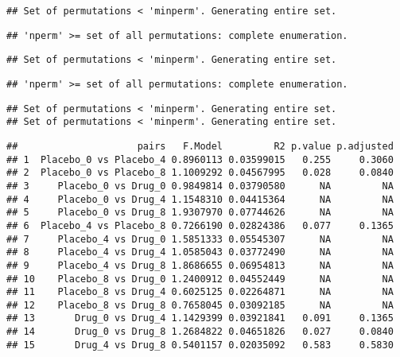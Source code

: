\documentclass[]{article}
\newenvironment{Shaded}{\begin{snugshade}}{\end{snugshade}}
\newcommand{\KeywordTok}[1]{\textcolor[rgb]{0.13,0.29,0.53}{\textbf{#1}}}
\newcommand{\DataTypeTok}[1]{\textcolor[rgb]{0.13,0.29,0.53}{#1}}
\newcommand{\StringTok}[1]{\textcolor[rgb]{0.31,0.60,0.02}{#1}}
\newcommand{\OtherTok}[1]{\textcolor[rgb]{0.56,0.35,0.01}{#1}}
\newcommand{\OperatorTok}[1]{\textcolor[rgb]{0.81,0.36,0.00}{\textbf{#1}}}
\newcommand{\NormalTok}[1]{#1}
\begin{document}
\begin{verbatim}
## Set of permutations < 'minperm'. Generating entire set.
\end{verbatim}

\begin{verbatim}
## 'nperm' >= set of all permutations: complete enumeration.
\end{verbatim}

\begin{verbatim}
## Set of permutations < 'minperm'. Generating entire set.
\end{verbatim}

\begin{verbatim}
## 'nperm' >= set of all permutations: complete enumeration.
\end{verbatim}

\begin{verbatim}
## Set of permutations < 'minperm'. Generating entire set.
## Set of permutations < 'minperm'. Generating entire set.
\end{verbatim}

\begin{verbatim}
##                     pairs   F.Model         R2 p.value p.adjusted
## 1  Placebo_0 vs Placebo_4 0.8960113 0.03599015   0.255     0.3060
## 2  Placebo_0 vs Placebo_8 1.1009292 0.04567995   0.028     0.0840
## 3     Placebo_0 vs Drug_0 0.9849814 0.03790580      NA         NA
## 4     Placebo_0 vs Drug_4 1.1548310 0.04415364      NA         NA
## 5     Placebo_0 vs Drug_8 1.9307970 0.07744626      NA         NA
## 6  Placebo_4 vs Placebo_8 0.7266190 0.02824386   0.077     0.1365
## 7     Placebo_4 vs Drug_0 1.5851333 0.05545307      NA         NA
## 8     Placebo_4 vs Drug_4 1.0585043 0.03772490      NA         NA
## 9     Placebo_4 vs Drug_8 1.8686655 0.06954813      NA         NA
## 10    Placebo_8 vs Drug_0 1.2400912 0.04552449      NA         NA
## 11    Placebo_8 vs Drug_4 0.6025125 0.02264871      NA         NA
## 12    Placebo_8 vs Drug_8 0.7658045 0.03092185      NA         NA
## 13       Drug_0 vs Drug_4 1.1429399 0.03921841   0.091     0.1365
## 14       Drug_0 vs Drug_8 1.2684822 0.04651826   0.027     0.0840
## 15       Drug_4 vs Drug_8 0.5401157 0.02035092   0.583     0.5830
\end{verbatim}

\begin{Shaded}
\end{Shaded}
\end{document}
